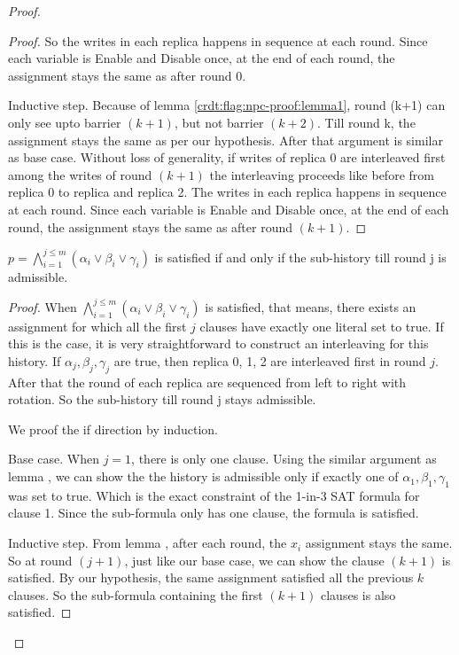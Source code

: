 \begin{proof}
\begin{proof}
    So the writes in each replica happens in sequence at each round. Since each variable is Enable and Disable once, at the end of each round, the assignment stays the same as after round 0.

    Inductive step. Because of lemma \ref{crdt:flag:npc-proof:lemma1}, round (k+1) can only see upto barrier $(k+1)$, but not barrier $(k+2)$. Till round k, the assignment stays the same as per our hypothesis. After that argument is similar as base case. Without loss of generality, if writes of replica 0 are interleaved first among the writes of round $(k+1)$ the interleaving proceeds like before from replica 0 to replica and replica 2. The writes in each replica happens in sequence at each round. Since each variable is Enable and Disable once, at the end of each round, the assignment stays the same as after round $(k+1)$.
  \end{proof}

  
  \begin{lemma}
    \label{crdt:flag:npc-proof:lemma3}
    $p = \bigwedge_{i=1}^{j \leq m} (\alpha_i \lor \beta_i \lor \gamma_i)$ is satisfied if and only if the sub-history till round j is admissible.
  \end{lemma}

  \begin{proof}
    When $\bigwedge_{i=1}^{j \leq m} (\alpha_i \lor \beta_i \lor \gamma_i)$ is satisfied, that means, there exists an assignment for which all the first $j$ clauses have exactly one literal set to true. If this is the case, it is very straightforward to construct an interleaving for this history. If $\alpha_j, \beta_j, \gamma_j$ are true, then replica 0, 1, 2 are interleaved first in round $j$. After that the round of each replica are sequenced from left to right with rotation. So the sub-history till round j stays admissible.
    
    We proof the if direction by induction.

    Base case. When $j = 1$, \ie there is only one clause. Using the similar argument as lemma \label{crdt:flag:npc-proof:lemma2}, we can show the the history is admissible only if exactly one of $\alpha_1, \beta_1, \gamma_1$ was set to true. Which is the exact constraint of the 1-in-3 SAT formula for clause 1. Since the sub-formula only has one clause, the formula is satisfied.

    Inductive step. From lemma \label{crdt:flag:npc-proof:lemma2}, after each round, the $x_i$ assignment stays the same. So at round $(j+1)$, just like our base case, we can show the clause $(k+1)$ is satisfied. By our hypothesis, the same assignment satisfied all the previous $k$ clauses. So the sub-formula containing the first $(k+1)$ clauses is also satisfied.
  \end{proof}


\end{proof}

